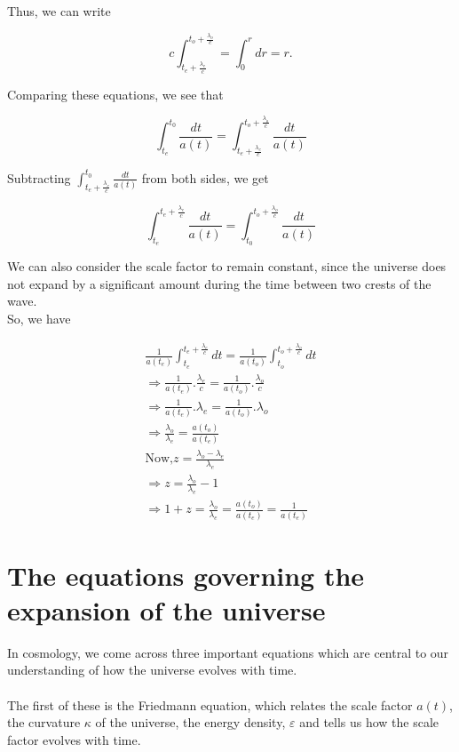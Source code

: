 \documentclass[a4,10pt,oneside]{report}
\begin{document}
	Thus, we can write
	
	\begin{equation}	
		c\int_{t_e+\frac{\lambda_e}{c}}^{t_o+\frac{\lambda_o}{c}}= \int_0^r dr = r.
	\end{equation}
	
	Comparing these equations, we see that
	
	\begin{equation}
		\int_{t_e}^{t_0} \frac{dt}{a(t)} = \int_{t_e+\frac{\lambda_e}{c}}^{t_o+\frac{\lambda_o}{c}} \frac{dt}{a(t)}
	\end{equation}
	
	Subtracting $ \int_{t_e+\frac{\lambda_e}{c}}^{t_0} \frac{dt}{a(t)} $ from both sides, we get
	
	\begin{equation}
		\int_{t_e}^{t_e+\frac{\lambda_e}{c}} \frac{dt}{a(t)} = \int_{t_0}^{t_o+\frac{\lambda_o}{c}} \frac{dt}{a(t)}
	\end{equation}
	
	We can also consider the scale factor to remain constant, since the universe does not expand by a significant amount during the time between two crests of the wave. \\
	
	So, we have
	
	\begin{eqnarray}
		\frac{1}{a(t_e)}\int_{t_e}^{t_e+\frac{\lambda_e}{c}} dt = \frac{1}{a(t_o)}\int_{t_o}^{t_o+\frac{\lambda_o}{c}} dt	
		\\
		\Rightarrow \frac{1}{a(t_e)}.\frac{\lambda_e}{c} = \frac{1}{a(t_o)}.\frac{\lambda_o}{c}
		\\
		\Rightarrow \frac{1}{a(t_e)}.\lambda_e = \frac{1}{a(t_o)}.\lambda_o
		\\
		\Rightarrow \frac{\lambda_o}{\lambda_e} = \frac{a(t_o)}{a(t_e)}
		\\
		\text{Now,} z=\frac{\lambda_o-\lambda_e}{\lambda_e} \\
		\Rightarrow z=\frac{\lambda_o}{\lambda_e}-1 \\
		\Rightarrow 1+z = \frac{\lambda_o}{\lambda_e} = \frac{a(t_o)}{a(t_e)} = \frac{1}{a(t_e)}
	\end{eqnarray}
	
	
	\section{The equations governing the expansion of the universe}
	
	In cosmology, we come across three important equations which are central to our understanding of how the universe evolves with time.\\ \\
	The first of these is the Friedmann equation, which relates the scale factor $a(t)$, the curvature $\kappa$ of the universe, the energy density, $\varepsilon$ and tells us how the scale factor evolves with time.\\
	
\end{document}
